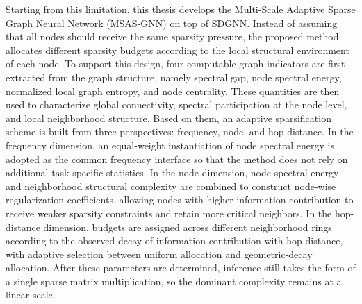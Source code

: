 \begin{abstract*}
Starting from this limitation, this thesis develops the Multi-Scale Adaptive Sparse Graph Neural Network (MSAS-GNN) on top of SDGNN. Instead of assuming that all nodes should receive the same sparsity pressure, the proposed method allocates different sparsity budgets according to the local structural environment of each node. To support this design, four computable graph indicators are first extracted from the graph structure, namely spectral gap, node spectral energy, normalized local graph entropy, and node centrality. These quantities are then used to characterize global connectivity, spectral participation at the node level, and local neighborhood structure. Based on them, an adaptive sparsification scheme is built from three perspectives: frequency, node, and hop distance. In the frequency dimension, an equal-weight instantiation of node spectral energy is adopted as the common frequency interface so that the method does not rely on additional task-specific statistics. In the node dimension, node spectral energy and neighborhood structural complexity are combined to construct node-wise regularization coefficients, allowing nodes with higher information contribution to receive weaker sparsity constraints and retain more critical neighbors. In the hop-distance dimension, budgets are assigned across different neighborhood rings according to the observed decay of information contribution with hop distance, with adaptive selection between uniform allocation and geometric-decay allocation. After these parameters are determined, inference still takes the form of a single sparse matrix multiplication, so the dominant complexity remains at a linear scale.


\end{abstract*}
